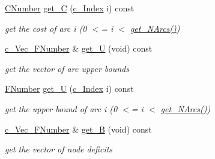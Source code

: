 \begin{Indent}
\begin{DoxyCompactItemize}
\mbox{\hyperlink{class_s_m_spp__di__unipi__it_1_1_m_c_f_block_a24d0627ba8213afe1ec4ebeb4508e8f1}{C\+Number}} \mbox{\hyperlink{class_s_m_spp__di__unipi__it_1_1_m_c_f_block_a128d14acf1228c1b4eaf1fd7606e8489}{get\+\_\+C}} (\mbox{\hyperlink{class_s_m_spp__di__unipi__it_1_1_m_c_f_block_aee6156e2ce80720d57a082d80f39d8cc}{c\+\_\+\+Index}} i) const
\begin{DoxyCompactList}\small\item\em get the cost of arc i (0 $<$= i $<$ \mbox{\hyperlink{class_s_m_spp__di__unipi__it_1_1_m_c_f_block_a42c106aa81abe650c7baa0da547ade7e}{get\+\_\+\+N\+Arcs()}}) \end{DoxyCompactList}\item 
\mbox{\hyperlink{class_s_m_spp__di__unipi__it_1_1_m_c_f_block_ae74990406673bbcdf64e1a3e3b680d5c}{c\+\_\+\+Vec\+\_\+\+F\+Number}} \& \mbox{\hyperlink{class_s_m_spp__di__unipi__it_1_1_m_c_f_block_a8bf8106813b11c77e6dd20868ad13cf6}{get\+\_\+U}} (void) const
\begin{DoxyCompactList}\small\item\em get the vector of arc upper bounds \end{DoxyCompactList}\item 
\mbox{\label{class_s_m_spp__di__unipi__it_1_1_m_c_f_block_a08e3a5a35d5b85b942ad43edb67bec2e}} 
\mbox{\hyperlink{class_s_m_spp__di__unipi__it_1_1_m_c_f_block_aeea3e5951d222b2a8e57de1b4246a909}{F\+Number}} \mbox{\hyperlink{class_s_m_spp__di__unipi__it_1_1_m_c_f_block_a08e3a5a35d5b85b942ad43edb67bec2e}{get\+\_\+U}} (\mbox{\hyperlink{class_s_m_spp__di__unipi__it_1_1_m_c_f_block_aee6156e2ce80720d57a082d80f39d8cc}{c\+\_\+\+Index}} i) const
\begin{DoxyCompactList}\small\item\em get the upper bound of arc i (0 $<$= i $<$ \mbox{\hyperlink{class_s_m_spp__di__unipi__it_1_1_m_c_f_block_a42c106aa81abe650c7baa0da547ade7e}{get\+\_\+\+N\+Arcs()}}) \end{DoxyCompactList}\item 
\mbox{\hyperlink{class_s_m_spp__di__unipi__it_1_1_m_c_f_block_ae74990406673bbcdf64e1a3e3b680d5c}{c\+\_\+\+Vec\+\_\+\+F\+Number}} \& \mbox{\hyperlink{class_s_m_spp__di__unipi__it_1_1_m_c_f_block_a7023cfc72d9fa95a2aa002a2abca390e}{get\+\_\+B}} (void) const
\begin{DoxyCompactList}\small\item\em get the vector of node deficits \end{DoxyCompactList}\item 

\end{DoxyCompactItemize}
\end{Indent}
